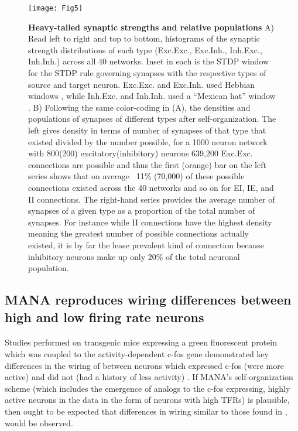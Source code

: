 \documentclass[10pt,letterpaper]{article}
\begin{document}
\begin{figure}[!h]
	\texttt{[image: Fig5]}
	\caption{{\bf Heavy-tailed synaptic strengths and relative populations}
		A) Read left to right and top to bottom, histograms of the synaptic strength distributions of each type (Exc.\textrightarrow Exc., Exc.\textrightarrow Inh., Inh.\textrightarrow Exc., Inh.\textrightarrow Inh.) across all 40 networks. Inset in each is the STDP window for the STDP rule governing synapses with the respective types of source and target neuron. Exc.\textrightarrow Exc. and Exc.\textrightarrow Inh. used Hebbian windows \cite{bi1998synaptic}\cite{fino2008cell}, while Inh.\textrightarrow Exc. and Inh.\textrightarrow Inh. used a ``Mexican hat'' window \cite{woodin2003coincident}. B) Following the same color-coding in (A), the densities and populations of synapses of different types after self-organization. The left gives density in terms of number of synapses of that type that existed divided by the number possible, for a 1000 neuron network with 800(200) excitatory(inhibitory) neurons 639,200 Exc.\textrightarrow Exc. connections are possible and thus the first (orange) bar on the left series shows that on average ~11\% (\~70,000) of these possible connections existed across the 40 networks and so on for EI, IE, and II connections. The right-hand series provides the average number of synapses of a given type as a proportion of the total number of synapses. For instance while II connections have the highest density meaning the greatest number of possible connections actually existed, it is by far the lease prevalent kind of connection because inhibitory neurons make up only 20\% of the total neuronal population. \footnotesize }
	\label{Fig5}
\end{figure}

\subsection*{MANA reproduces wiring differences between high and low firing rate neurons}
\label{Sec.MANA_FR_wire}
\paragraph{}
Studies performed on transgenic mice expressing a green fluorescent protein which was coupled to the activity-dependent c-fos gene demonstrated key differences in the wiring of between neurons which expressed c-fos (were more active) and did not (had a history of less activity) \cite{barth2004alteration}\cite{yassin2010embedded}\cite{benedetti2012differential}. If MANA's self-organization scheme (which includes the emergence of analogs to the c-fos expressing, highly active neurons in the data in the form of neurons with high TFRs) is plausible, then ought to be expected that differences in wiring similar to those found in \cite{benedetti2012differential}, would be observed. 
\end{document}
